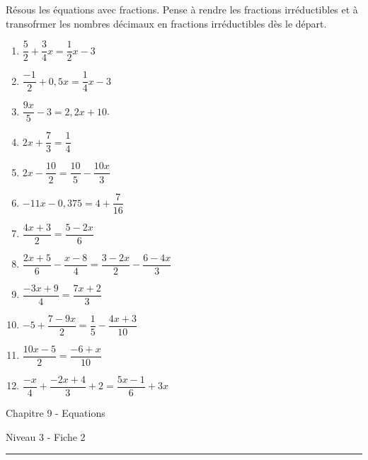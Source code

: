 \documentclass[12pt,parskip=half-, twoside=semi]{scrartcl}
\begin{document}
\begin{exercise}
  Résous les équations avec fractions. Pense à rendre les fractions irréductibles et à transofrmer les nombres décimaux en fractions irréductibles dès le départ.
  \begin{enumerate}[itemsep=0.4cm]   
      \item $\dfrac{5}{2}+\dfrac{3}{4} x=\dfrac{1}{2} x-3$
      \item $\dfrac{-1}{2}+0,5 x=\dfrac{1}{4} x-3$
      \item $\dfrac{9 x}{5}-3=2,2 x+10$.
      \item $2 x+\dfrac{7}{3}=\dfrac{1}{4}$
      \item $2 x-\dfrac{10}{2}=\dfrac{10}{5}-\dfrac{10 x}{3}$
      \item $-11 x-0,375=4+\dfrac{7}{16}$
      \item $\dfrac{4 x+3}{2}=\dfrac{5-2 x}{6}$
      \item $\dfrac{2 x+5}{6}-\dfrac{x-8}{4}=\dfrac{3-2 x}{2}-\dfrac{6-4 x}{3}$
      \item $\dfrac{-3 x+9}{4}=\dfrac{7 x+2}{3}$
      \item $-5+\dfrac{7-9 x}{2}=\dfrac{1}{5}-\dfrac{4 x+3}{10}$
      \item $\dfrac{10 x-5}{2}=\dfrac{-6+x}{10}$
      \item $\dfrac{-x}{4}+\dfrac{-2 x+4}{3}+2=\dfrac{5 x-1}{6}+3 x$
  \end{enumerate}
\end{exercise}


\newpage


\begin{center}
  \bfseries
  \begin{Huge}
    Chapitre 9 - Equations
  \end{Huge}
  \smallbreak
  \begin{large}
    Niveau 3  - Fiche 2
  \end{large}
  \smallbreak
  \rule[10pt]{.5\linewidth}{1 pt}
\end{center}
\setcounter{exercise}{0}
\end{document}
